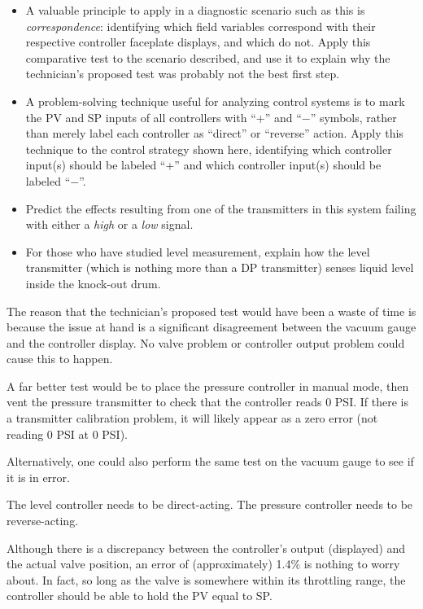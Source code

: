 \begin{itemize}
\item{} A valuable principle to apply in a diagnostic scenario such as this is {\it correspondence}: identifying which field variables correspond with their respective controller faceplate displays, and which do not.  Apply this comparative test to the scenario described, and use it to explain why the technician's proposed test was probably not the best first step.
\item{} A problem-solving technique useful for analyzing control systems is to mark the PV and SP inputs of all controllers with ``+'' and ``$-$'' symbols, rather than merely label each controller as ``direct'' or ``reverse'' action.  Apply this technique to the control strategy shown here, identifying which controller input(s) should be labeled ``+'' and which controller input(s) should be labeled ``$-$''.
\item{} Predict the effects resulting from one of the transmitters in this system failing with either a {\it high} or a {\it low} signal.
\item{} For those who have studied level measurement, explain how the level transmitter (which is nothing more than a DP transmitter) senses liquid level inside the knock-out drum.
\end{itemize}







The reason that the technician's proposed test would have been a waste of time is because the issue at hand is a significant disagreement between the vacuum gauge and the controller display.  No valve problem or controller output problem could cause this to happen.
 
A far better test would be to place the pressure controller in manual mode, then vent the pressure transmitter to check that the controller reads 0 PSI.  If there is a transmitter calibration problem, it will likely appear as a zero error (not reading 0 PSI at 0 PSI).  

Alternatively, one could also perform the same test on the vacuum gauge to see if it is in error.

\vskip 10pt

The level controller needs to be direct-acting.  The pressure controller needs to be reverse-acting.

\vskip 10pt

Although there is a discrepancy between the controller's output (displayed) and the actual valve position, an error of (approximately) 1.4\% is nothing to worry about.  In fact, so long as the valve is somewhere within its throttling range, the controller should be able to hold the PV equal to SP.












